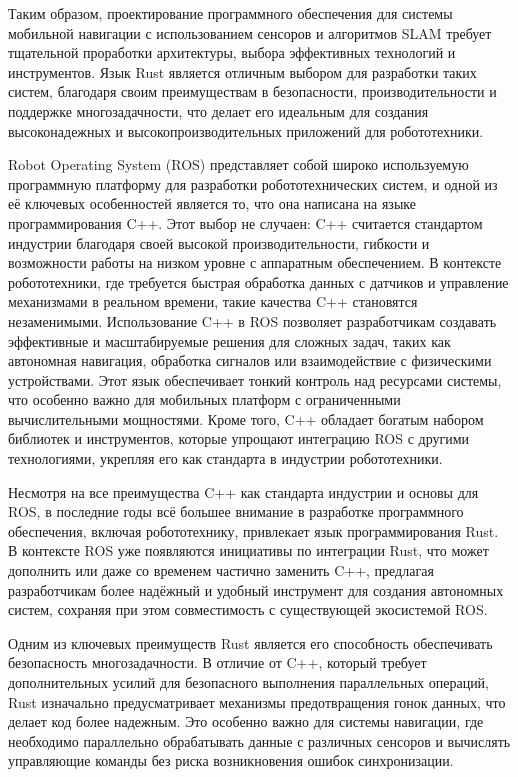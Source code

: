 Таким образом, проектирование программного обеспечения для системы мобильной
навигации с использованием сенсоров и алгоритмов SLAM требует тщательной
проработки архитектуры, выбора эффективных технологий и инструментов. Язык Rust
является отличным выбором для разработки таких систем, благодаря своим
преимуществам в безопасности, производительности и поддержке многозадачности,
что делает его идеальным для создания высоконадежных и высокопроизводительных
приложений для робототехники.

Robot Operating System (ROS) представляет собой широко используемую программную
платформу для разработки робототехнических систем, и одной из её ключевых
особенностей является то, что она написана на языке программирования C++. Этот
выбор не случаен: C++ считается стандартом индустрии благодаря своей высокой
производительности, гибкости и возможности работы на низком уровне с аппаратным
обеспечением. В контексте робототехники, где требуется быстрая обработка данных
с датчиков и управление механизмами в реальном времени, такие качества C++
становятся незаменимыми. Использование C++ в ROS позволяет разработчикам
создавать эффективные и масштабируемые решения для сложных задач, таких как
автономная навигация, обработка сигналов или взаимодействие с физическими
устройствами. Этот язык обеспечивает тонкий контроль над ресурсами системы, что
особенно важно для мобильных платформ с ограниченными вычислительными
мощностями. Кроме того, C++ обладает богатым набором библиотек и инструментов,
которые упрощают интеграцию ROS с другими технологиями, укрепляя его как
стандарта в индустрии робототехники.

Несмотря на все преимущества C++ как стандарта индустрии и основы для ROS, в
последние годы всё большее внимание в разработке программного обеспечения,
включая робототехнику, привлекает язык программирования Rust. В контексте ROS
уже появляются инициативы по интеграции Rust, что может дополнить или даже со
временем частично заменить C++, предлагая разработчикам более надёжный и удобный
инструмент для создания автономных систем, сохраняя при этом совместимость с
существующей экосистемой ROS.

Одним из ключевых преимуществ Rust является его способность обеспечивать
безопасность многозадачности. В отличие от C++, который требует дополнительных
усилий для безопасного выполнения параллельных операций, Rust изначально
предусматривает механизмы предотвращения гонок данных, что делает код более
надежным. Это особенно важно для системы навигации, где необходимо параллельно
обрабатывать данные с различных сенсоров и вычислять управляющие команды без
риска возникновения ошибок синхронизации.

